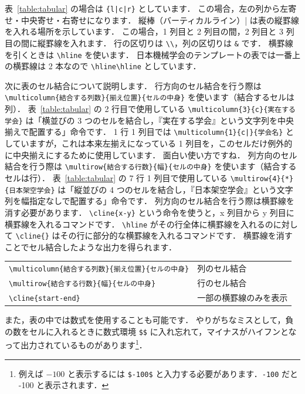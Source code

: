 表~\ref{table:tabular} の場合は \texttt{\{l|c|r\}} としています．
この場合，左の列から左寄せ・中央寄せ・右寄せになります．
縦棒（バーティカルライン）\verb||| は表の縦罫線を入れる場所を示しています．
この場合，1 列目と 2 列目の間，2 列目と 3 列目の間に縦罫線を入れます．
行の区切りは \verb|\\|，列の区切りは \verb|&| です．
横罫線を引くときは \verb|\hline| を使います．
日本機械学会のテンプレートの表では一番上の横罫線は 2 本なので \verb|\hline\hline| としています．

次に表のセル結合について説明します．
行方向のセル結合を行う際は \verb|\multicolumn{結合する列数}{揃え位置}{セルの中身}| を使います（結合するセルは列）．
表~\ref{table:tabular} の 2 行目で使用している \verb|\multicolumn{3}{c}{実在する学会}| は「横並びの 3 つのセルを結合し，『実在する学会』という文字列を中央揃えで配置する」命令です．
1 行 1 列目では \texttt{\textbackslash multicolumn\{1\}\{c|\}\{学会名\}} としていますが，これは本来左揃えになっている 1 列目を，このセルだけ例外的に中央揃えにするために使用しています．
面白い使い方ですね．
列方向のセル結合を行う際は \verb|\multirow{結合する行数}{幅}{セルの中身}| を使います（結合するセルは行）．
表~\ref{table:tabular} の 7 行 1 列目で使用している \verb|\multirow{4}{*}{日本架空学会}| は「縦並びの 4 つのセルを結合し，『日本架空学会』という文字列を幅指定なしで配置する」命令です．
列方向のセル結合を行う際は横罫線を消す必要があります．
\verb|\cline{x-y}| という命令を使うと，x 列目から y 列目に横罫線を入れるコマンドです．
\verb|\hline| がその行全体に横罫線を入れるのに対して \verb|\cline{}| はその行に部分的な横罫線を入れるコマンドです．
横罫線を消すことでセル結合したような出力を得られます．

\begin{tcolorbox}[title={\texttt{tabular} 環境でセル結合する際に使用するコマンド}]
    \begin{tabular}{ll}
        \verb|\multicolumn{結合する列数}{揃え位置}{セルの中身}| & 列のセル結合  \\
        \verb|\multirow{結合する行数}{幅}{セルの中身}|  & 行のセル結合  \\
        \verb|\cline{start-end}|    & 一部の横罫線のみを表示
    \end{tabular}
\end{tcolorbox}

また，表の中では数式を使用することも可能です．
やりがちなミスとして，負の数をセルに入れるときに数式環境 \verb|$$| に入れ忘れて，マイナスがハイフンとなって出力されているものがあります\footnote{例えば $-100$ と表示するには \texttt{\$-100\$} と入力する必要があります．\texttt{-100} だと -100 と表示されます．}．


